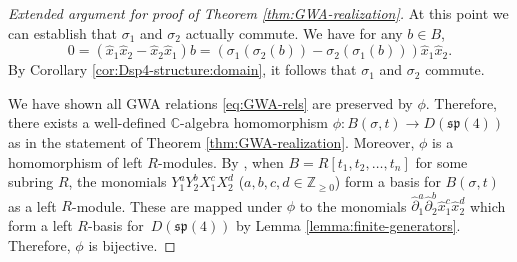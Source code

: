 \documentclass[10pt,a4paper]{amsart}
\numberwithin{equation}{section}
\begin{document}
\begin{proof}[Extended argument for proof of Theorem \ref{thm:GWA-realization}]
	At this point we can establish that $\sigma_1$ and $\sigma_2$ actually commute.
	We have for any $b\in B$,
	\[0=(\hat{x}_1\hat{x}_2 -\hat{x}_2\hat{x}_1)b = (\sigma_1(\sigma_2(b))-\sigma_2(\sigma_1(b)))\hat{x}_1\hat{x}_2.\]
	By Corollary \ref{cor:Dsp4-structure:domain}, it follows that $\sigma_1$ and $\sigma_2$ commute.
	
	We have shown all GWA relations \eqref{eq:GWA-rels} are preserved by $\phi$. Therefore, there exists a well-defined $\mathbb{C}$-algebra homomorphism $\phi\colon B(\sigma,t)\to D(\mathfrak{sp}(4))$ as in the statement of Theorem \ref{thm:GWA-realization}. Moreover, $\phi$ is a homomorphism of left $R$-modules.
	By \cite{bavula1992generalized}, when $B=R[t_1,t_2,\dots,t_n]$ for some subring $R$, the monomials $Y_1^aY_2^bX_1^cX_2^d$ ($a,b,c,d\in\mathbb{Z}_{\geq 0}$) form a basis for $B(\sigma,t)$ as a left $R$-module. These are mapped under $\phi$ to the monomials $\hat{\partial}_1^a\hat{\partial}_2^b\hat{x}_1^c\hat{x}_2^d$ which form a left $R$-basis for~$D(\mathfrak{sp}(4))$ by Lemma \ref{lemma:finite-generators}.
	Therefore, $\phi$ is bijective.
\end{proof}
\end{document}
